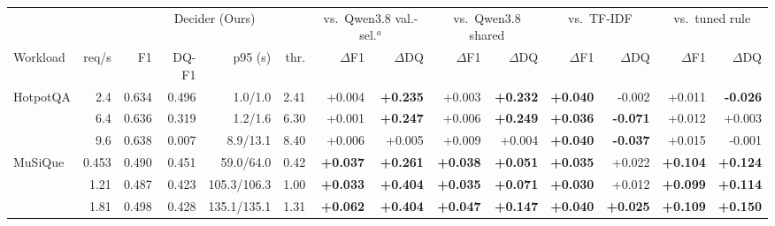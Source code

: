 \begin{tabular}{@{}lr rrrr rr rr rr rr@{}}
\toprule
 & & \multicolumn{4}{c}{Decider (Ours)} & \multicolumn{2}{c}{vs.\ Qwen3.8 val.-sel.$^a$} & \multicolumn{2}{c}{vs.\ Qwen3.8 shared} & \multicolumn{2}{c}{vs.\ TF-IDF} & \multicolumn{2}{c}{vs.\ tuned rule}\\
\cmidrule(lr){3-6}\cmidrule(lr){7-8}\cmidrule(lr){9-10}\cmidrule(lr){11-12}\cmidrule(lr){13-14}
Workload & req/s & F1 & DQ-F1 & p95 (s) & thr. & $\Delta$F1 & $\Delta$DQ & $\Delta$F1 & $\Delta$DQ & $\Delta$F1 & $\Delta$DQ & $\Delta$F1 & $\Delta$DQ\\
\midrule
HotpotQA & 2.4 & 0.634 & 0.496 & 1.0/1.0 & 2.41 & +0.004 & \textbf{+0.235} & +0.003 & \textbf{+0.232} & \textbf{+0.040} & -0.002 & +0.011 & \textbf{-0.026}\\
 & 6.4 & 0.636 & 0.319 & 1.2/1.6 & 6.30 & +0.001 & \textbf{+0.247} & +0.006 & \textbf{+0.249} & \textbf{+0.036} & \textbf{-0.071} & +0.012 & +0.003\\
 & 9.6 & 0.638 & 0.007 & 8.9/13.1 & 8.40 & +0.006 & +0.005 & +0.009 & +0.004 & \textbf{+0.040} & \textbf{-0.037} & +0.015 & -0.001\\
\midrule
MuSiQue & 0.453 & 0.490 & 0.451 & 59.0/64.0 & 0.42 & \textbf{+0.037} & \textbf{+0.261} & \textbf{+0.038} & \textbf{+0.051} & \textbf{+0.035} & +0.022 & \textbf{+0.104} & \textbf{+0.124}\\
 & 1.21 & 0.487 & 0.423 & 105.3/106.3 & 1.00 & \textbf{+0.033} & \textbf{+0.404} & \textbf{+0.035} & \textbf{+0.071} & \textbf{+0.030} & +0.012 & \textbf{+0.099} & \textbf{+0.114}\\
 & 1.81 & 0.498 & 0.428 & 135.1/135.1 & 1.31 & \textbf{+0.062} & \textbf{+0.404} & \textbf{+0.047} & \textbf{+0.147} & \textbf{+0.040} & \textbf{+0.025} & \textbf{+0.109} & \textbf{+0.150}\\
\bottomrule
\end{tabular}
